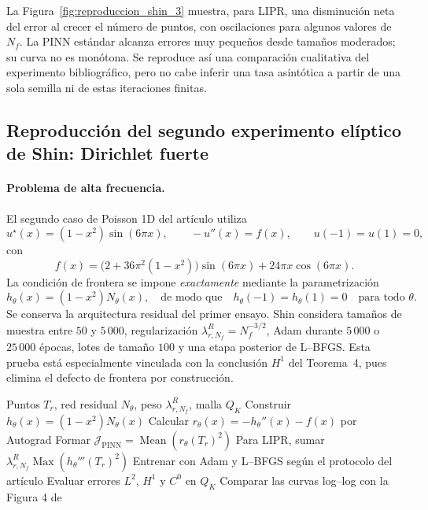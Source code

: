 La Figura~\ref{fig:reproduccion_shin_3} muestra, para LIPR, una disminución neta del error al crecer el número de puntos, con oscilaciones para algunos valores de $N_f$. La PINN estándar alcanza errores muy pequeños desde tamaños moderados; su curva no es monótona. Se reproduce así una comparación cualitativa del experimento bibliográfico, pero no cabe inferir una tasa asintótica a partir de una sola semilla ni de estas iteraciones finitas.

\subsection{Reproducción del segundo experimento elíptico de Shin: Dirichlet fuerte}
\label{subsec:shin_frontera_fuerte}

\paragraph{Problema de alta frecuencia.}
El segundo caso de Poisson 1D del artículo utiliza
\[
u^\star(x)=(1-x^2)\sin(6\pi x),\qquad
-u''(x)=f(x),\qquad u(-1)=u(1)=0,
\]
con
\[
f(x)=\bigl(2+36\pi^2(1-x^2)\bigr)\sin(6\pi x)
+24\pi x\cos(6\pi x).
\]
La condición de frontera se impone \emph{exactamente} mediante la parametrización
\[
h_\theta(x)=(1-x^2)N_\theta(x),
\quad\text{de modo que}\quad h_\theta(-1)=h_\theta(1)=0
\quad\text{para todo }\theta.
\]
Se conserva la arquitectura residual del primer ensayo. Shin considera tamaños de muestra entre $50$ y $5\,000$, regularización $\lambda_{r,N_f}^{R}=N_f^{-3/2}$, Adam durante $5\,000$ o $25\,000$ épocas, lotes de tamaño $100$ y una etapa posterior de L--BFGS. Esta prueba está especialmente vinculada con la conclusión $H^1$ del Teorema~4, pues elimina el defecto de frontera por construcción.

\begin{algorithm}
\caption{Protocolo para Poisson 1D oscilatorio con frontera fuerte}
\label{alg:shin_oscila}
\begin{algorithmic}[1]
\Require Puntos $T_r$, red residual $N_\theta$, peso $\lambda_{r,N_f}^{R}$, malla $Q_K$
\State Construir $h_\theta(x)=(1-x^2)N_\theta(x)$ 
\State Calcular $r_\theta(x)=-h_\theta''(x)-f(x)$ por Autograd
    \State Formar $\mathcal J_{\mathrm{PINN}}=\operatorname{Mean}(r_\theta(T_r)^2)$
    \State Para LIPR, sumar $\lambda_{r,N_f}^{R}\operatorname{Max}(h_\theta'''(T_r)^2)$
    \State Entrenar con Adam y L--BFGS según el protocolo del artículo
    \State Evaluar errores $L^2$, $H^1$ y $C^0$ en $Q_K$
\EndFor
\State Comparar las curvas log--log con la Figura 4 de \cite{shin2020convergence}
\end{algorithmic}
\end{algorithm}

